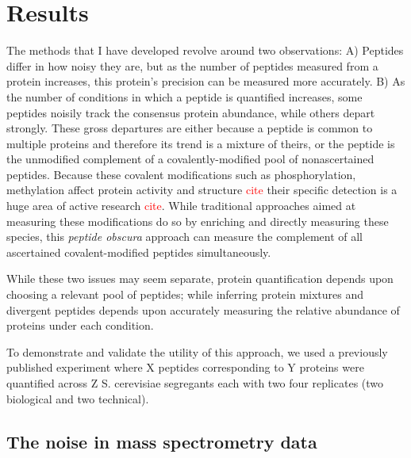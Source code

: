 \documentclass[12pt]{article}
\begin{document}
\section*{Results}

The methods that I have developed revolve around two observations: A) Peptides differ in how noisy they are, but as the number of peptides measured from a protein increases, this protein's precision can be measured more accurately. B) As the number of conditions in which a peptide is quantified increases, some peptides noisily track the consensus protein abundance, while others depart strongly. These gross departures are either because a peptide is common to multiple proteins and therefore its trend is a mixture of theirs, or the peptide is the unmodified complement of a covalently-modified pool of nonascertained peptides. Because these covalent modifications such as phosphorylation, methylation affect protein activity and structure \textcolor{red}{cite} their specific detection is a huge area of active research \textcolor{red}{cite}.  While traditional approaches aimed at measuring these modifications do so by enriching and directly measuring these species, this \textit{peptide obscura} approach can measure the complement of all ascertained covalent-modified peptides simultaneously.

While these two issues may seem separate, protein quantification depends upon choosing a relevant pool of peptides; while inferring protein mixtures and divergent peptides depends upon accurately measuring the relative abundance of proteins under each condition.

To demonstrate and validate the utility of this approach, we used a previously published experiment where X peptides corresponding to Y proteins were quantified across Z S. cerevisiae segregants each with two four replicates (two biological and two technical).

\subsection*{The noise in mass spectrometry data}
\end{document}
